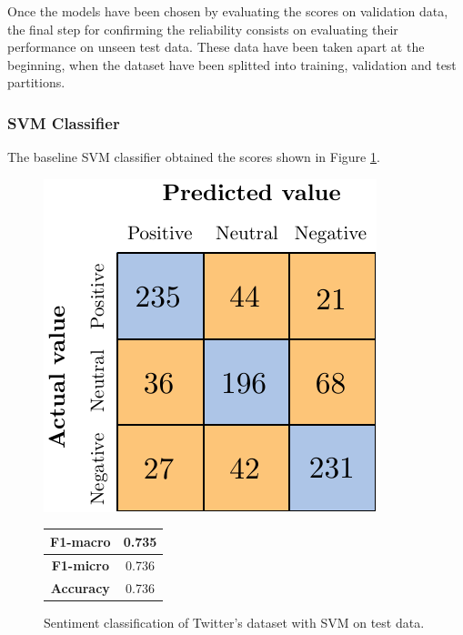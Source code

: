 Once the models have been chosen by evaluating the scores on validation data, the final step for confirming the reliability consists on evaluating their performance on unseen test data. These data have been taken apart at the beginning, when the dataset have been splitted into training, validation and test partitions.

\subsubsection{SVM Classifier}

The baseline SVM classifier obtained the scores shown in Figure \ref{fig:tw_snt_svm_tst}.


\begin{figure}[H]
	\begin{minipage}[b]{0.6\linewidth}
		\centering
		\includegraphics[scale=1]{figures/conf_matrices/twitter_snt_svm/twitter_snt_svm_tst.pdf}
	\end{minipage}
	\begin{minipage}[b]{0.3\linewidth}
		\begin{tabular}[b]{ | c | c | } 
			\hline
			\textbf{F1-macro} & 0.735 \\
			\hline
			\textbf{F1-micro} & 0.736 \\ 
			\hline
			\textbf{Accuracy} & 0.736 \\ 
			\hline
		\end{tabular}
	\end{minipage}
	\caption{Sentiment classification of Twitter's dataset with SVM on test data.}
	\label{fig:tw_snt_svm_tst}
\end{figure}


